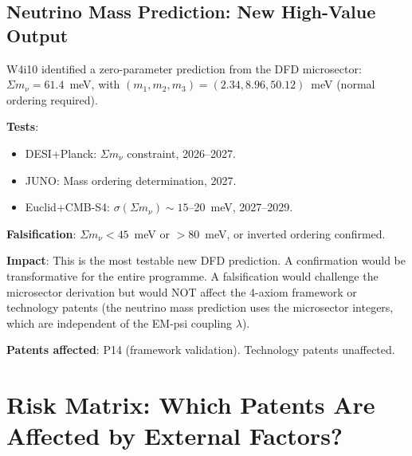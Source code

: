 \documentclass[11pt]{article}
\begin{document}
\subsection{Neutrino Mass Prediction: New High-Value Output}

\begin{tcolorbox}[colback=green!5!white, colframe=green!60!black,
  title=\textbf{OPPORTUNITY: $\Sigma m_\nu = 61.4$~meV --- Testable by 2027}]

W4i10 identified a zero-parameter prediction from the DFD microsector:
$\Sigma m_\nu = 61.4$~meV, with $(m_1, m_2, m_3) = (2.34, 8.96, 50.12)$~meV
(normal ordering required).

\textbf{Tests}:
\begin{itemize}[nosep]
  \item DESI+Planck: $\Sigma m_\nu$ constraint, 2026--2027.
  \item JUNO: Mass ordering determination, 2027.
  \item Euclid+CMB-S4: $\sigma(\Sigma m_\nu) \sim 15$--20~meV, 2027--2029.
\end{itemize}

\textbf{Falsification}: $\Sigma m_\nu < 45$~meV or $> 80$~meV, or
inverted ordering confirmed.

\textbf{Impact}: This is the most testable new DFD prediction. A
confirmation would be transformative for the entire programme. A
falsification would challenge the microsector derivation but would NOT
affect the 4-axiom framework or technology patents (the neutrino mass
prediction uses the microsector integers, which are independent of the
EM-psi coupling $\lambda$).

\textbf{Patents affected}: P14 (framework validation). Technology patents
unaffected.
\end{tcolorbox}

\section{Risk Matrix: Which Patents Are Affected by External Factors?}
\label{sec:risk-matrix}
\end{document}
